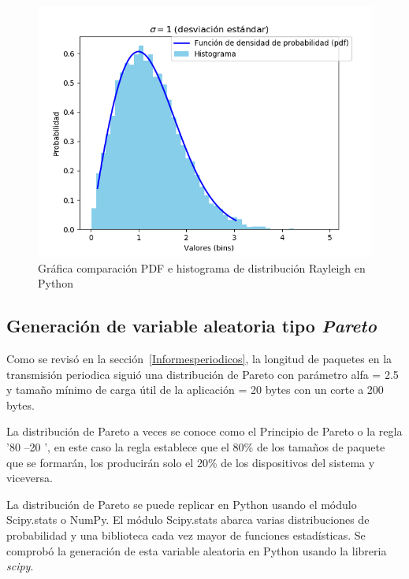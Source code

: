 \begin{figure}[th]
    \centering
    \includegraphics[scale=.7]{Figures/RayleighDistribution.png}
    \decoRule
    \caption[Gráfica comparación PDF e histograma de distribución Rayleigh en Python]{Gráfica comparación PDF e histograma de distribución Rayleigh en Python}
    \label{fig:generacionRay}
\end{figure}
\break

\subsection{Generación de variable aleatoria tipo \textit{Pareto}}

Como se revisó en la sección~\ref{Informesperiodicos}, la longitud de paquetes en la transmisión periodica siguió una distribución de Pareto con parámetro alfa = 2.5 y tamaño mínimo de carga útil de la aplicación = 20 bytes con un corte a 200 bytes.\newline

La distribución de Pareto a veces se conoce como el Principio de Pareto o la regla '80 –20 ', en este caso la regla establece que el 80\% de los tamaños de paquete que se formarán, los producirán solo el 20\% de los dispositivos del sistema y viceversa.\newline

La distribución de Pareto se puede replicar en Python usando el módulo Scipy.stats o NumPy. El módulo Scipy.stats abarca varias distribuciones de probabilidad y una biblioteca cada vez mayor de funciones estadísticas. Se comprobó la generación de esta variable aleatoria en Python usando la libreria \textit{scipy}.\newline

